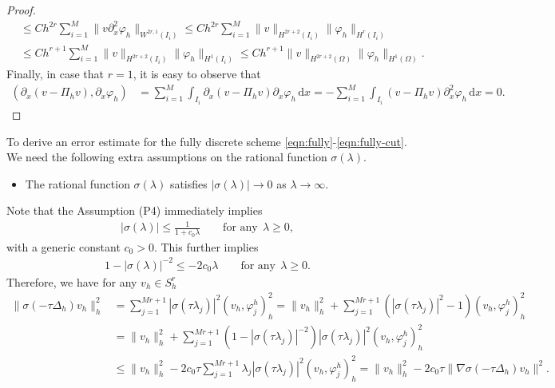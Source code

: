 \documentclass[10pt,final,leqno,onefignum,onetabnum]{siamltex}%
\def\d{\textrm{d}}
\def\d{\mathrm{d}}
\def\II{(\Omega)}
\def\fy{\varphi}
\begin{document}
\begin{proof}
\begin{align*}
&\le C h^{2r} \sum_{i=1}^M \|  v  \partial_x^2 \fy_h  \|_{W^{2r,1}(I_i)} \le  C h^{2r} \sum_{i=1}^M \|   v  \|_{H^{2r+2}(I_i)}  \| \fy_h  \|_{H^{r}(I_i)}\\
&\le Ch^{r+1} \sum_{i=1}^M \|   v  \|_{H^{2r+2}(I_i)}  \| \fy_h  \|_{H^{1}(I_i)} \le Ch^{r+1}  \|   v  \|_{H^{2r+2}\II}  \| \fy_h  \|_{H^{1}\II}.
\end{align*}
Finally, in case that $r=1$, it is easy to observe that
\begin{align*}
 ( \partial_x (v- \Pi_h v), \partial_x \fy_h )
 &= \sum_{i=1}^M \int_{I_i}  \partial_x (v- \Pi_h v) \partial_x \fy_h \,\d x
 =-\sum_{i=1}^M \int_{I_i}    (v- \Pi_h v) \partial_x^2 \fy_h \,\d x=0.
\end{align*}
\end{proof}

To derive an error estimate for the fully discrete scheme \eqref{eqn:fully}-\eqref{eqn:fully-cut}. We need the following extra assumptions on the
rational function $\sigma(\lambda)$.
\begin{itemize}
\item[{\bf (P4)}] The rational function $\sigma(\lambda)$ satisfies $|\sigma(\lambda)| \rightarrow 0$ as $\lambda\rightarrow\infty$.
\end{itemize}
Note that the Assumption (P4) immediately implies \cite[eq. (7.37)]{Thomee:2006}
\begin{align*}
 |\sigma(\lambda)| \le \frac{1}{1+c_0\lambda} \qquad \text{for any}~~\lambda\ge 0,
\end{align*}
with a generic constant $c_0>0$. This further implies
\begin{align*}
 1-|\sigma(\lambda)|^{-2} \le - 2 c_0 \lambda\qquad \text{for any}~~\lambda\ge 0.
\end{align*}
Therefore, we have for any $v_h\in S_h^r$
\begin{align*}
 \|  \sigma(-\tau\Delta_h) v_h \|_h^2 &= \sum_{j=1}^{Mr+1} |\sigma(\tau\lambda_j)|^2 (v_h, \fy_j^h)_h^2
 = \|  v_h \|_h^2 +  \sum_{j=1}^{Mr+1} (|\sigma(\tau\lambda_j)|^2-1) (v_h, \fy_j^h)_h^2 \\
 &=\|  v_h \|_h^2 + \sum_{j=1}^{Mr+1} (1-|\sigma(\tau\lambda_j)|^{-2}) |\sigma(\tau\lambda_j)|^2(v_h, \fy_j^h)_h^2\\
 &\le \|  v_h \|_h^2 - 2c_0\tau \sum_{j=1}^{Mr+1}  \lambda_j |\sigma(\tau\lambda_j)|^2(v_h, \fy_j^h)_h^2
 = \|  v_h \|_h^2 - 2c_0\tau \| \nabla \sigma(-\tau\Delta_h) v_h\|^2.
\end{align*}
\end{document}
